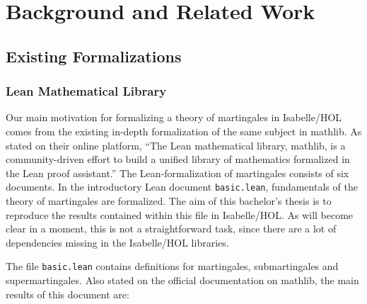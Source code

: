 ﻿%

\chapter{Background and Related Work}\label{chapter:background}

\section{Existing Formalizations}

\subsection{Lean Mathematical Library}

Our main motivation for formalizing a theory of martingales in Isabelle/HOL comes from the existing in-depth formalization of the same subject in \textsf{mathlib}. As stated on their online platform, ``The Lean mathematical library, \textsf{mathlib}, is a community-driven effort to build a unified library of mathematics formalized in the Lean proof assistant.'' The Lean-formalization of martingales consists of six documents. In the introductory Lean document \texttt{basic.lean}, fundamentals of the theory of martingales are formalized. The aim of this bachelor's thesis is to reproduce the results contained within this file in Isabelle/HOL. As will become clear in a moment, this is not a straightforward task, since there are a lot of dependencies missing in the Isabelle/HOL libraries.

The file \texttt{basic.lean} contains definitions for martingales, submartingales and supermartingales. Also stated on the official documentation on \textsf{mathlib}, the main results of this document are:


